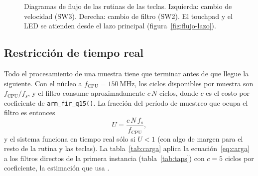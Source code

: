 \documentclass[11pt,a4paper]{article}
\newcommand{\ciclosportap}{5}
\begin{document}
\begin{figure}[H]
\centering
{}
\caption{Diagramas de flujo de las rutinas de las teclas. Izquierda: cambio
de velocidad (SW3). Derecha: cambio de filtro (SW2). El touchpad y el LED se
atienden desde el lazo principal (figura~\ref{fig:flujo-lazo}).}
\label{fig:flujo-teclas}
\end{figure}

\subsection{Restricción de tiempo real}\label{sec:carga}

Todo el procesamiento de una muestra tiene que terminar antes de que llegue
la siguiente. Con el núcleo a $f_{\text{CPU}} = \qty{150}{\mega\hertz}$, los
ciclos disponibles por muestra son $f_{\text{CPU}}/f_s$, y el filtro consume
aproximadamente $c\,N$ ciclos, donde $c$ es el costo por coeficiente de
\texttt{arm\_fir\_q15()}. La fracción del período de muestreo que ocupa el
filtro es entonces
\begin{equation}
  U = \frac{c\, N\, f_s}{f_{\text{CPU}}},
  \label{eq:carga}
\end{equation}
y el sistema funciona en tiempo real sólo si $U < 1$ (con algo de margen para
el resto de la rutina y las teclas). La tabla~\ref{tab:carga} aplica la
ecuación~\eqref{eq:carga} a los filtros directos de la primera instancia
(tabla~\ref{tab:taps}) con $c = \ciclosportap$ ciclos por coeficiente, la
estimación que usa .
\end{document}
